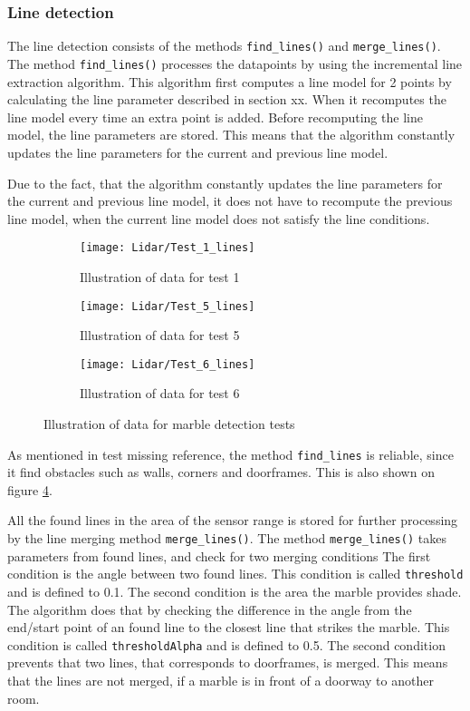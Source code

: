 \documentclass[../Head/Main.tex]{subfiles}
\begin{document}
\subsubsection{Line detection}
The line detection consists of the methods \texttt{find\_lines()} and \texttt{merge\_lines()}.\\
The method \texttt{find\_lines()} processes the datapoints by using the incremental line extraction algorithm. This algorithm first computes a line model for 2 points by calculating the line parameter described in section xx. When it recomputes the line model every time an extra point is added. Before recomputing the line model, the line parameters are stored. This means that the algorithm constantly updates the line parameters for the current and previous line model.\par
Due to the fact, that the algorithm constantly updates the line parameters for the current and previous line model, it does not have to recompute the previous line model, when the current line model does not satisfy the line conditions.
\begin{figure}[H]
  \begin{subfigure}[b]{0.3\textwidth}
  	\centering
    \texttt{[image: Lidar/Test\_1\_lines]}
    \caption{Illustration of data for test 1}
    \label{fig:LineTest1}
  \end{subfigure}
  \hfill
  \begin{subfigure}[b]{0.3\textwidth}
  	\centering
    \texttt{[image: Lidar/Test\_5\_lines]}
    \caption{Illustration of data for test 5}
    \label{fig:LineTest5}
  \end{subfigure}
  \hfill
  \begin{subfigure}[b]{0.3\textwidth}
    \centering
    \texttt{[image: Lidar/Test\_6\_lines]}
    \caption{Illustration of data for test 6}
    \label{fig:LineTest6}
  \end{subfigure}
  \caption{Illustration of data for marble detection tests}
  \label{fig:LineTests}
\end{figure}
As mentioned in test {\color{red} missing reference}, the method \texttt{find\_lines} is reliable, since it find obstacles such as walls, corners and doorframes. This is also shown on figure \ref{fig:LineTests}.\par
All the found lines in the area of the sensor range is stored for further processing by the line merging method \texttt{merge\_lines()}.
The method \texttt{merge\_lines()} takes parameters from found lines, and check for two merging conditions The first condition is the angle between two found lines. This condition is called \texttt{threshold} and is defined to 0.1. The second condition is the area the marble provides shade. The algorithm does that by checking the difference in the angle from the end/start point of an found line to the closest line that strikes the marble. This condition is called \texttt{thresholdAlpha} and is defined to 0.5. The second condition prevents that two lines, that corresponds to doorframes, is merged. This means that the lines are not merged, if a marble is in front of a doorway to another room.\par
\end{document}
